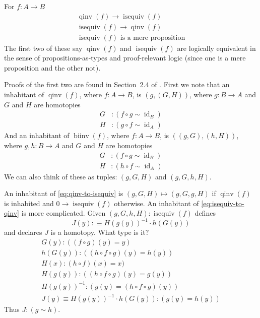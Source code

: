\documentclass[11pt]{article}
\DeclareMathOperator{\idfun}{id}
\DeclareMathOperator{\biinv}{biinv}
\DeclareMathOperator{\qinv}{qinv}
\DeclareMathOperator{\isequiv}{isequiv}
\begin{document}
For $f : A \to B$
\begin{subequations}
\begin{gather}
   \qinv(f) \to \isequiv(f)
   \label{eq:qinv-to-isequiv}
   \\
   \isequiv(f) \to \qinv(f)
   \label{eq:isequiv-to-qinv}
   \\
   \text{$\isequiv(f)$ is a mere proposition}
   \label{eq:isequiv-proposition}
\end{gather}
\end{subequations}
The first two of these say $\qinv(f)$ and $\isequiv(f)$ are logically
equivalent in the sense of propositions-as-types and proof-relevant logic
(since one is a mere proposition and the other not).

Proofs of the first two are found in Section~2.4 of .
First we note that an inhabitant of $\qinv(f)$, where $f : A \to B$,
is $(g, (G, H))$, where $g : B \to A$ and $G$ and $H$ are homotopies
\begin{align*}
   G & : (f \circ g \sim \idfun_B)
   \\
   H & : (g \circ f \sim \idfun_A)
\end{align*}
And an inhabitant of $\biinv(f)$, where $f : A \to B$,
is $((g, G), (h, H))$, where $g, h : B \to A$ and $G$ and $H$ are homotopies
\begin{align*}
   G & : (f \circ g \sim \idfun_B)
   \\
   H & : (h \circ f \sim \idfun_A)
\end{align*}
We can also think of these as tuples: $(g, G, H)$ and $(g, G, h, H)$.

An inhabitant of \eqref{eq:qinv-to-isequiv}
is $(g, G, H) \mapsto (g, G, g, H)$ if $\qinv(f)$ is inhabited and
$0 \to \isequiv(f)$ otherwise.
An inhabitant of \eqref{eq:isequiv-to-qinv} is more complicated.
Given $(g, G, h, H) : \isequiv(f)$  defines
$$
   J(y) :\equiv H(g(y))^{-1} \cdot h(G(y))
$$
and declares $J$ is a homotopy.  What type is it?
\begin{gather*}
   G(y) : ((f \circ g)(y) = y)
   \\
   h(G(y)) : ((h \circ f \circ g)(y) = h(y))
   \\
   H(x) : (h \circ f)(x) = x)
   \\
   H(g(y)) : ((h \circ f \circ g)(y) = g(y))
   \\
   H(g(y))^{-1} : (g(y) = (h \circ f \circ g)(y))
   \\
   J(y) \equiv H(g(y))^{-1} \cdot h(G(y)) : (g(y) = h(y))
\end{gather*}
Thus $J : (g \sim h)$.
\end{document}
